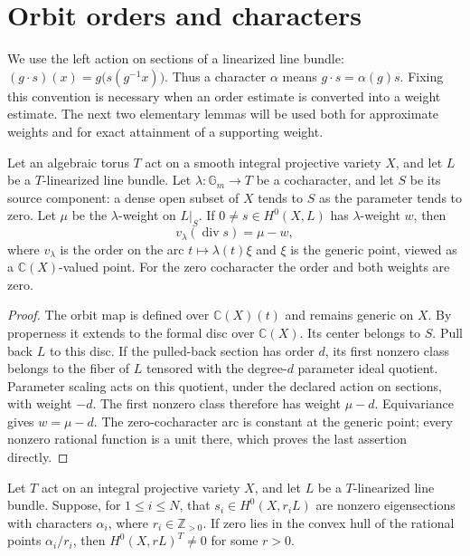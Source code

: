 \section{Orbit orders and characters}
\label{V:sec-order-weight}

We use the left action on sections of a linearized line bundle:
$(g\cdot s)(x)=g\bigl(s(g^{-1}x)\bigr)$.  Thus a character
$\alpha$ means $g\cdot s=\alpha(g)s$.  Fixing this convention is
necessary when an order estimate is converted into a weight estimate.
The next two elementary lemmas will be used both for approximate
weights and for exact attainment of a supporting weight.

\begin{lemma}\label{V:order-weight}
Let an algebraic torus $T$ act on a smooth integral projective variety
$X$, and let $L$ be a $T$-linearized line bundle.  Let
$\lambda:\mathbb G_m\to T$ be a cocharacter, and let $S$ be its
source component: a dense open subset of $X$ tends to $S$ as the
parameter tends to zero.  Let $\mu$ be the $\lambda$-weight on
$L|_S$.  If $0\ne s\in H^0(X,L)$ has $\lambda$-weight $w$, then
\[
 v_\lambda(\operatorname{div}s)=\mu-w,
\]
where $v_\lambda$ is the order on the arc
$t\mapsto\lambda(t)\xi$ and $\xi$ is the generic point, viewed as
a $\mathbb C(X)$-valued point.  For the zero cocharacter the order
and both weights are zero.
\end{lemma}

\begin{proof}
The orbit map is defined over $\mathbb C(X)(t)$ and remains generic
on $X$.  By properness it extends to the formal disc over
$\mathbb C(X)$.  Its center belongs to $S$.  Pull back $L$ to this disc.
If the pulled-back section has order $d$, its first nonzero class
belongs to the fiber of $L$ tensored with the degree-$d$ parameter
ideal quotient.  Parameter scaling acts on this quotient, under
the declared action on sections, with weight $-d$.  The first
nonzero class therefore has weight $\mu-d$.  Equivariance gives
$w=\mu-d$.  The zero-cocharacter arc is constant at the generic
point; every nonzero rational function is a unit there, which
proves the last assertion directly.
\end{proof}

\begin{lemma}\label{V:convex-product}
Let $T$ act on an integral projective variety $X$, and let $L$ be
a $T$-linearized line bundle.  Suppose, for $1\le i\le N$, that $s_i\in H^0(X,r_iL)$ are
nonzero eigensections with characters $\alpha_i$, where
$r_i\in\mathbb Z_{>0}$.
If zero lies in the convex hull of the rational points
$\alpha_i/r_i$, then $H^0(X,rL)^T\ne0$ for some $r>0$.
\end{lemma}

